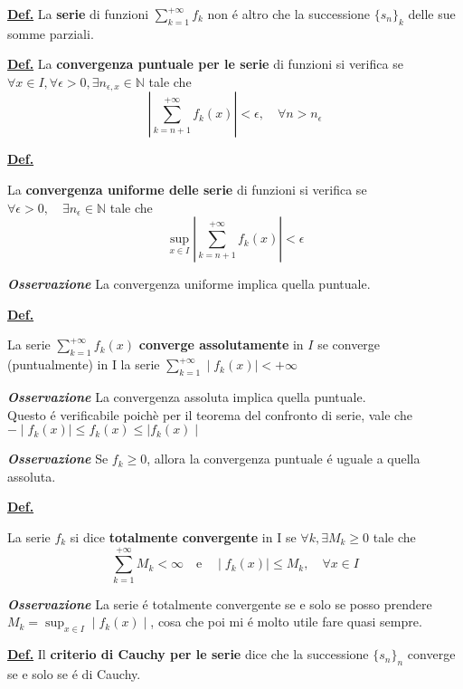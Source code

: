 \documentclass[a4paper,10pt]{article} %
\renewcommand{\b}[1]{%
    {\textbf{#1}}}
\newcommand{\ldef}[1]{%
    {\smallbreak\par\normalsize\textbf{\underline{Def.}} {#1} \smallbreak}}
\newcommand{\loss}[1]{%
    {\smallbreak\par\scriptsize\emph{\textbf{Osservazione}} {#1} \par}}
\begin{document}
\begin{multicols}{2}
\ldef{
    La \b{serie} di funzioni $\displaystyle \sum_{k=1}^{+\infty} f_k$ non \'{e} altro che la successione $\{s_n\}_k$ delle sue somme parziali.
}

\ldef{
    La \b{convergenza puntuale per le serie} di funzioni si verifica se $\forall x \in I, \forall \epsilon > 0, \exists n_{\epsilon, x} \in \mathbb{N}$ tale che 
        $$ \left| \sum_{k=n+1}^{+\infty} f_k(x) \right| < \epsilon, \quad \forall n > n_\epsilon $$
}

\ldef{
    La \b{convergenza uniforme delle serie} di funzioni si verifica se 
    $ \forall \epsilon > 0, \quad \exists n_\epsilon \in \mathbb{N}$ tale che
    $$ \sup_{x\in I} \left| \sum_{k=n+1}^{+\infty} f_k(x) \right| < \epsilon $$

    \loss{
        La convergenza uniforme implica quella puntuale.
    }
}

\ldef{
    La serie $\displaystyle \sum_{k=1}^{+\infty} f_k(x)$  \b{converge assolutamente} in $I$ se converge (puntualmente) in I la serie $\displaystyle \sum_{k=1}^{+\infty} \mid f_k(x) \mid < + \infty $

    \loss{
        La convergenza assoluta implica quella puntuale. \\ Questo \'{e} verificabile poich\`{e} per il teorema del confronto di serie, vale che 
            $ -\mid f_k(x) \mid \leq f_k(x) \leq \mid f_k(x) \mid $
    }

    \loss{
        Se $ f_k \geq 0$, allora la convergenza puntuale \'{e} uguale a quella assoluta.
    }

}

\ldef{
    La serie $f_k$ si dice \b{totalmente convergente} in I se $\forall k, \exists M_k \geq 0 $ tale che 
        $$ \sum_{k=1}^{+\infty} M_k < \infty \quad \text{e} \quad \mid f_k(x) \mid \leq M_k, \quad \forall x \in I $$

    \loss{
        La serie \'{e} totalmente convergente se e solo se posso prendere $\displaystyle M_k = \sup_{x\in I} \mid f_k(x) \mid $, cosa che poi mi \'{e} molto utile fare quasi sempre.
    }
}

\ldef{
    Il \b{criterio di Cauchy per le serie} dice che la successione $\{s_n\}_n$ converge se e solo se \'{e} di Cauchy.
}


\end{multicols}
\end{document}
